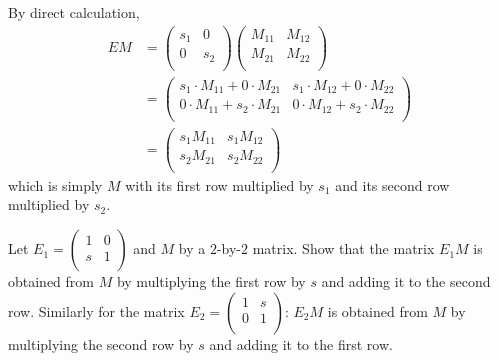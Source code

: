 \documentclass[../group-theory-in-a-nutshell-for-physicists.tex]{subfiles}
\begin{document}
\begin{questions}
\begin{solution}
	By direct calculation,
	\begin{align*}
		EM &= \begin{pmatrix}
		s_{1} & 0 \\
		0 & s_{2} \\
		\end{pmatrix}\begin{pmatrix}
		M_{11} & M_{12} \\
		M_{21} & M_{22} \\
		\end{pmatrix} \\
		&= \begin{pmatrix}
		s_{1} \cdot M_{11} + 0 \cdot M_{21} & s_{1} \cdot M_{12} + 0 \cdot M_{22} \\
		0 \cdot M_{11} + s_{2} \cdot M_{21} & 0 \cdot M_{12} + s_{2} \cdot M_{22} \\
		\end{pmatrix} \\
		&= \begin{pmatrix}
		s_{1}M_{11} & s_{1}M_{12} \\
		s_{2}M_{21} & s_{2}M_{22} \\
		\end{pmatrix}
	\end{align*}
	which is simply $M$ with its first row multiplied by $s_1$ and its second row multiplied by $s_2$.
\end{solution}

\question Let $E_{1} = \begin{pmatrix}
1 & 0 \\
s & 1 \\
\end{pmatrix}$ and $M$ by a $2$-by-$2$ matrix. Show that the matrix
$E_{1}M$ is obtained from $M$ by multiplying the first row by $s$
and adding it to the second row. Similarly for the matrix
$E_{2} = \begin{pmatrix}
1 & s \\
0 & 1 \\
\end{pmatrix}$: $E_{2}M$ is obtained from $M$ by multiplying the
second row by $s$ and adding it to the first row.


\end{questions}
\end{document}
